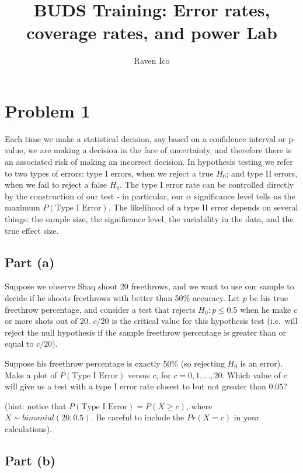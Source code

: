 \documentclass[]{article}
\title{BUDS Training: Error rates, coverage rates, and power Lab}
\subtitle{Raven Ico}
\author{}
\date{}
\begin{document}
\maketitle

\section{Problem 1}\label{problem-1}

Each time we make a statistical decision, say based on a confidence
interval or p-value, we are making a decision in the face of
uncertainty, and therefore there is an associated risk of making an
incorrect decision. In hypothesis testing we refer to two types of
errors: type I errors, when we reject a true \(H_0\); and type II
errors, when we fail to reject a false \(H_0\). The type I error rate
can be controlled directly by the construction of our test - in
particular, our \(\alpha\) significance level tells us the maximum
\(P(\mbox{Type I Error})\). The likelihood of a type II error depends on
several things: the sample size, the significance level, the variability
in the data, and the true effect size.

\subsection{Part (a)}\label{part-a}

Suppose we observe Shaq shoot 20 freethrows, and we want to use our
sample to decide if he shoots freethrows with better than 50\% accuracy.
Let \(p\) be his true freethrow percentage, and consider a test that
rejects \(H_0: p \leq 0.5\) when he make \(c\) or more shots out of 20.
\(c/20\) is the critical value for this hypothesis test (i.e.~will
reject the null hypothesis if the sample freethrow percentage is greater
than or equal to \(c/20\)).

Suppose his freethrow percentage is exactly 50\% (so rejecting \(H_0\)
is an error). Make a plot of \(P(\mbox{Type I Error})\) versus \(c\),
for \(c=0,1,\ldots,20\). Which value of \(c\) will give us a test with a
type I error rate closest to but not greater than \(0.05\)?

(hint: notice that \(P(\mbox{Type I Error}) = P(X \geq c)\), where
\(X\sim binomial(20,0.5)\). Be careful to include the \(Pr(X=c)\) in
your calculations).

\subsection{Part (b)}\label{part-b}
\end{document}
